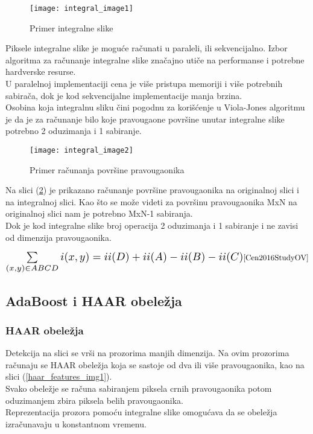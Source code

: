 \begin{figure}[h]
  \centering
  \texttt{[image: integral\_image1]}
  \caption{Primer integralne slike}
  \label{IntegralImage_img1}
\end{figure}

Piksele integralne slike je moguće računati u paraleli, ili
sekvencijalno. Izbor algoritma za računanje integralne slike značajno utiče na
performanse i potrebne hardverske resurse. \\
U paralelnoj implementaciji cena je
više pristupa memoriji i više potrebnih sabirača, dok je kod sekvencijalne
implementacije manja brzina. \\

Osobina koja integralnu sliku čini pogodnu za korišćenje u Viola-Jones algoritmu
je da je za računanje bilo koje pravougaone površine unutar integralne slike
potrebno 2 oduzimanja i 1 sabiranje.

\begin{figure}[h]
  \centering
  \texttt{[image: integral\_image2]}
  \caption{Primer računanja površine pravougaonika \cite{IntegralImage1_web}}
  \label{IntegralImage_img2}
\end{figure}

Na slici (\ref{IntegralImage_img2}) je prikazano računanje površine pravougaonika na
originalnoj slici i na integralnoj slici.
Kao što se može videti za površinu pravougaonika MxN na originalnoj slici nam je
potrebno MxN-1 sabiranja. \\
Dok je kod integralne slike broj operacija 2 oduzimanja i 1 sabiranje i ne zavisi od dimenzija pravougaonika.

\begin{equation}
  \Scale[1.4]{\sum\limits_{(x,y)\in ABCD} i(x,y)=ii(D)+ii(A)-ii(B)-ii(C)}
  \cite{Cen2016StudyOV}
  \label{IntegralImage_eq2}
\end{equation}

\newpage

\subsection{AdaBoost i HAAR obeležja}

\subsubsection{HAAR obeležja}

Detekcija na slici se vrši na prozorima manjih dimenzija. Na ovim prozorima
računaju se HAAR obeležja koja se sastoje od dva ili više pravougaonika, kao na
slici (\ref{haar_features_img1}). \\
Svako obeležje se računa sabiranjem piksela crnih pravougaonika potom
oduzimanjem zbira piksela belih pravougaonika. \\
Reprezentacija prozora pomoću integralne slike omogućava da se obeležja izračunavaju u konstantnom vremenu.


